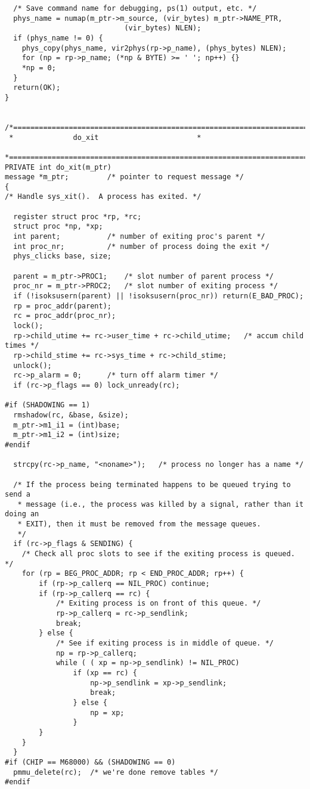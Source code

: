 \begin{verbatim}
  /* Save command name for debugging, ps(1) output, etc. */
  phys_name = numap(m_ptr->m_source, (vir_bytes) m_ptr->NAME_PTR,
							(vir_bytes) NLEN);
  if (phys_name != 0) {
	phys_copy(phys_name, vir2phys(rp->p_name), (phys_bytes) NLEN);
	for (np = rp->p_name; (*np & BYTE) >= ' '; np++) {}
	*np = 0;
  }
  return(OK);
}


/*===========================================================================*
 *				do_xit					     *
 *===========================================================================*/
PRIVATE int do_xit(m_ptr)
message *m_ptr;			/* pointer to request message */
{
/* Handle sys_xit().  A process has exited. */

  register struct proc *rp, *rc;
  struct proc *np, *xp;
  int parent;			/* number of exiting proc's parent */
  int proc_nr;			/* number of process doing the exit */
  phys_clicks base, size;

  parent = m_ptr->PROC1;	/* slot number of parent process */
  proc_nr = m_ptr->PROC2;	/* slot number of exiting process */
  if (!isoksusern(parent) || !isoksusern(proc_nr)) return(E_BAD_PROC);
  rp = proc_addr(parent);
  rc = proc_addr(proc_nr);
  lock();
  rp->child_utime += rc->user_time + rc->child_utime;	/* accum child times */
  rp->child_stime += rc->sys_time + rc->child_stime;
  unlock();
  rc->p_alarm = 0;		/* turn off alarm timer */
  if (rc->p_flags == 0) lock_unready(rc);

#if (SHADOWING == 1)
  rmshadow(rc, &base, &size);
  m_ptr->m1_i1 = (int)base;
  m_ptr->m1_i2 = (int)size;
#endif

  strcpy(rc->p_name, "<noname>");	/* process no longer has a name */

  /* If the process being terminated happens to be queued trying to send a
   * message (i.e., the process was killed by a signal, rather than it doing an
   * EXIT), then it must be removed from the message queues.
   */
  if (rc->p_flags & SENDING) {
	/* Check all proc slots to see if the exiting process is queued. */
	for (rp = BEG_PROC_ADDR; rp < END_PROC_ADDR; rp++) {
		if (rp->p_callerq == NIL_PROC) continue;
		if (rp->p_callerq == rc) {
			/* Exiting process is on front of this queue. */
			rp->p_callerq = rc->p_sendlink;
			break;
		} else {
			/* See if exiting process is in middle of queue. */
			np = rp->p_callerq;
			while ( ( xp = np->p_sendlink) != NIL_PROC)
				if (xp == rc) {
					np->p_sendlink = xp->p_sendlink;
					break;
				} else {
					np = xp;
				}
		}
	}
  }
#if (CHIP == M68000) && (SHADOWING == 0)
  pmmu_delete(rc);	/* we're done remove tables */
#endif


\end{verbatim}

